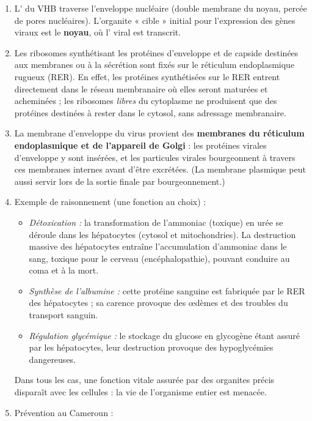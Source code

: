 \documentclass[11pt]{article}
\newcommand{\cle}[1]{{\popxbold\color{popdark}#1}}
\begin{document}
\begin{corrige}
\begin{enumerate}
    \item L' du VHB traverse l'\cle{enveloppe nucléaire} (double membrane du noyau, percée de pores nucléaires). L'organite « cible » initial pour l'expression des gènes viraux est le \textbf{noyau}, où l' viral est transcrit.
    \item Les ribosomes synthétisant les protéines d'enveloppe et de capside destinées aux membranes ou à la sécrétion sont fixés sur le \cle{réticulum endoplasmique rugueux} (RER). En effet, les protéines synthétisées sur le RER entrent directement dans le réseau membranaire où elles seront maturées et acheminées ; les ribosomes \emph{libres} du cytoplasme ne produisent que des protéines destinées à rester dans le cytosol, sans adressage membranaire.
    \item La membrane d'enveloppe du virus provient des \textbf{membranes du réticulum endoplasmique et de l'appareil de Golgi} : les protéines virales d'enveloppe y sont insérées, et les particules virales bourgeonnent à travers ces membranes internes avant d'être excrétées. (La membrane plasmique peut aussi servir lors de la sortie finale par bourgeonnement.)
    \item Exemple de raisonnement (une fonction au choix) :
    \begin{itemize}
        \item \emph{Détoxication :} la transformation de l'ammoniac (toxique) en urée se déroule dans les hépatocytes (cytosol et mitochondries). La destruction massive des hépatocytes entraîne l'accumulation d'ammoniac dans le sang, toxique pour le cerveau (encéphalopathie), pouvant conduire au coma et à la mort.
        \item \emph{Synthèse de l'albumine :} cette protéine sanguine est fabriquée par le RER des hépatocytes ; sa carence provoque des œdèmes et des troubles du transport sanguin.
        \item \emph{Régulation glycémique :} le stockage du glucose en glycogène étant assuré par les hépatocytes, leur destruction provoque des hypoglycémies dangereuses.
    \end{itemize}
    Dans tous les cas, une fonction vitale assurée par des organites précis disparaît avec les cellules : la vie de l'organisme entier est menacée.
    \item Prévention au Cameroun :

\end{enumerate}
\end{corrige}
\end{document}
